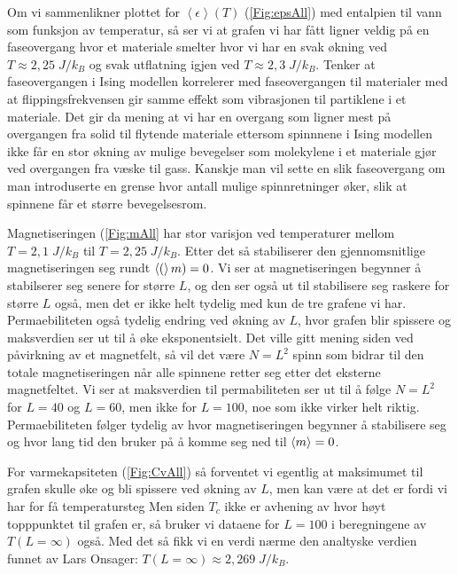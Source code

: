 \documentclass[reprint,english,notitlepage]{revtex4-2}  %
\begin{document}
Om vi sammenlikner plottet for $\left < \epsilon \right > (T)$ (\autoref{Fig:epsAll}) med entalpien til vann som funksjon av temperatur, så ser vi at grafen vi har fått ligner veldig på en faseovergang hvor et materiale smelter hvor vi har en svak økning ved $T \approx 2,25 \; J/k_B$ og svak utflatning igjen ved $T \approx 2,3 \; J/k_B$. Tenker at faseovergangen i Ising modellen korrelerer med faseovergangen til materialer med at flippingsfrekvensen gir samme effekt som vibrasjonen til partiklene i et materiale. Det gir da mening at vi har en overgang som ligner mest på overgangen fra solid til flytende materiale ettersom spinnnene i Ising modellen ikke får en stor økning av mulige bevegelser som molekylene i et materiale gjør ved overgangen fra væske til gass. Kanskje man vil sette en slik faseovergang om man introduserte en grense hvor antall mulige spinnretninger øker, slik at spinnene får et større bevegelsesrom.

Magnetiseringen (\autoref{Fig:mAll} har stor varisjon ved temperaturer mellom $T = 2,1 \; J/k_B$ til $T = 2,25 \; J/k_B$. Etter det så stabiliserer den gjennomsnitlige magnetiseringen seg rundt $ \expval(m) = 0$. Vi ser at magnetiseringen begynner å stabilserer seg senere for større $L$, og den ser også ut til stabilisere seg raskere for større $L$ også, men det er ikke helt tydelig med kun de tre grafene vi har. Permaebiliteten også tydelig endring ved økning av $L$, hvor grafen blir spissere og maksverdien ser ut til å øke eksponentsielt. Det ville gitt mening siden ved påvirkning av et magnetfelt, så vil det være $N = L^2$ spinn som bidrar til den totale magnetiseringen når alle spinnene retter seg etter det eksterne magnetfeltet. Vi ser at maksverdien til permabiliteten ser ut til å følge $N = L^2$ for $L = 40$ og $L = 60$, men ikke for $L = 100$, noe som ikke virker helt riktig. Permaebiliteten følger tydelig av hvor magnetiseringen begynner å stabilisere seg og hvor lang tid den bruker på å komme seg ned til $\expval{m} = 0$. 

For varmekapsiteten (\autoref{Fig:CvAll}) så forventet vi egentlig at maksimumet til grafen skulle øke og bli spissere ved økning av $L$, men kan være at det er fordi vi har for få temperatursteg  Men siden  $T_c$ ikke er avhening av hvor høyt topppunktet til grafen er, så bruker vi dataene for $L = 100$ i beregningene av $T \left ( L = \infty \right ) $ også. Med det så fikk vi en verdi nærme den analtyske verdien funnet av Lars Onsager: $T \left ( L = \infty \right ) \approx 2,269 \; J/k_B$.
\end{document}
